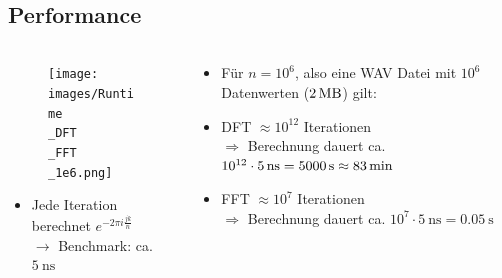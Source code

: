 \subsection{Performance}
\begin{frame}{\insertsection}
	\framesubtitle{\insertsubsection}

	\begin{columns}[T] %
	\begin{column}{0.6\textwidth}
		\begin{figure}
			\centering
			\texttt{[image: images/Runtime\\\_DFT\\\_FFT\\\_1e6.png]}
		\end{figure}
		\begin{itemize}
			\item Jede Iteration berechnet $e^{-2\pi i \frac{jk}{n}}$
			\\ $\rightarrow$ Benchmark: ca. $\SI{5}{\nano\second}$
		\end{itemize}
	\end{column}
	\hfill
	\begin{column}{0.48\textwidth}
		\begin{itemize}
			\vspace{1em}
			\item[] Für $n=10^6$, also eine WAV Datei mit $10^6$ Datenwerten ($\SI{2}{\mega\byte}$) gilt:
			\item DFT $ \approx 10^{12}$ Iterationen
			\\ $\Rightarrow$ Berechnung dauert ca. $10^{12} \cdot \SI{5}{\nano\second} = \SI{5000}{\second} \newline \approx \SI{83}{\minute}$ 
			\item FFT $ \approx 10^{7}$ Iterationen
			\\ $\Rightarrow$ Berechnung dauert ca. $10^{7} \cdot \SI{5}{\nano\second} = \SI{0.05}{\second}$
		\end{itemize}
	\end{column}
	\end{columns}
\end{frame}


